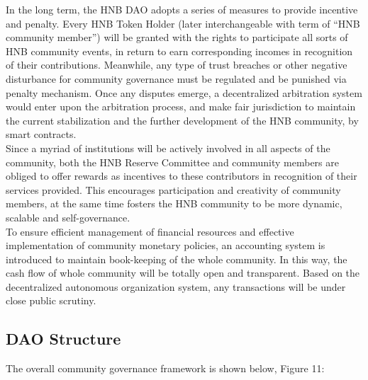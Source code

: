 \documentclass[fleqn,10pt]{SelfArx} %
\begin{document}
In the long term, the HNB DAO adopts a series of measures to provide incentive and penalty. Every HNB Token Holder (later interchangeable with term of “HNB community member”) will be granted with the rights to participate all sorts of HNB community events, in return to earn corresponding incomes in recognition of their contributions. Meanwhile, any type of trust breaches or other negative disturbance for community governance must be regulated and be punished via penalty mechanism. Once any disputes emerge, a decentralized arbitration system would enter upon the arbitration process, and make fair jurisdiction to maintain the current stabilization and the further development of the HNB community, by smart contracts. \\ 

Since a myriad of institutions will be actively involved in all aspects of the community, both the HNB Reserve Committee and community members are obliged to offer rewards as incentives to these contributors in recognition of their services provided. This encourages participation and creativity of community members, at the same time fosters the HNB community to be more dynamic, scalable and self-governance. \\

To ensure efficient management of financial resources and effective implementation of community monetary policies, an accounting system is introduced to maintain book-keeping of the whole community. In this way, the cash flow of whole community will be totally open and transparent. Based on the decentralized autonomous organization system, any transactions will be under close public scrutiny. \\


\subsection{DAO Structure}
The overall community governance framework is shown below, Figure 11: 
\end{document}
